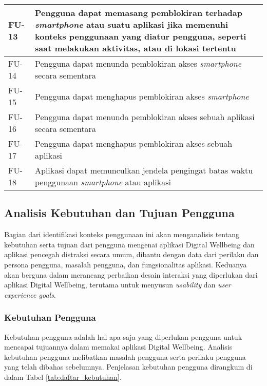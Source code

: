 \begin{small}
\begin{longtable}[c]{|W{c}{0.08\textwidth}|>{\ccnormspacing}m{0.82\textwidth}|}
  FU-13  &  Pengguna dapat memasang pemblokiran terhadap \textit{smartphone} atau suatu aplikasi jika memenuhi konteks penggunaan yang diatur pengguna, seperti saat melakukan aktivitas, atau di lokasi tertentu \\ \hline
  FU-14  &  Pengguna dapat menunda pemblokiran akses \textit{smartphone} secara sementara \\ \hline
  FU-15  &  Pengguna dapat menghapus pemblokiran akses \textit{smartphone}\\ \hline
  FU-16  &  Pengguna dapat menunda pemblokiran akses sebuah aplikasi secara sementara \\ \hline
  FU-17  &  Pengguna dapat menghapus pemblokiran akses sebuah aplikasi \\ \hline
  FU-18  &  Aplikasi dapat memunculkan jendela pengingat batas waktu penggunaan \textit{smartphone} atau aplikasi \\ \hline
  
  
\end{longtable}
\end{small}
\justifying
\FloatBarrier

\subsection{Analisis Kebutuhan dan Tujuan Pengguna}
\label{subsec:analisis_kebutuhan_tujuan}

Bagian dari identifikasi konteks penggunaan ini akan menganalisis tentang kebutuhan serta tujuan dari pengguna mengenai aplikasi Digital Wellbeing dan aplikasi pencegah distraksi secara umum, dibantu dengan data dari perilaku dan persona pengguna, masalah pengguna, dan fungsionalitas aplikasi. Keduanya akan berguna dalam merancang perbaikan desain interaksi yang diperlukan dari aplikasi Digital Wellbeing, terutama untuk menyusun \textit{usability} dan \textit{user experience goals}.

\subsubsection{Kebutuhan Pengguna}
\label{subsubsec:kebutuhan_pengguna}

Kebutuhan pengguna adalah hal apa saja yang diperlukan pengguna untuk mencapai tujuannya dalam memakai aplikasi Digital Wellbeing. Analisis kebutuhan pengguna melibatkan masalah pengguna serta perilaku pengguna yang telah dibahas sebelumnya. Penjelasan kebutuhan pengguna dirangkum di dalam Tabel \ref{tab:daftar_kebutuhan}.

